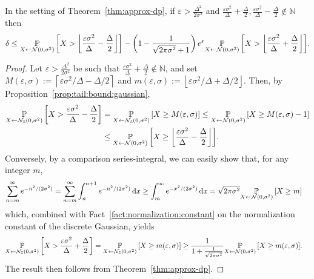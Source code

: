 \documentclass{jpc}
\newcommand{\dgausss}[2]{{\discN\left(#1,#2\right)}}
\newcommand{\dgauss}[1]{\dgausss{0}{#1}}
\newcommand{\pr}[2]{{\ifx&#1& \mathbb{P} \else
\underset{#1}{\mathbb{P}} \fi \left[#2\right]}}
\newcommand{\eqdef}{:=}
\newcommand{\eps}{\varepsilon}
\newcommand{\dx}[1][x]{\mathrm{d}#1}
\begin{document}
\begin{lem}
In the setting of Theorem~\ref{thm:approx-dp}, if $\eps > \frac{\Delta^2}{2\sigma^2}$ and $\frac{\eps\sigma^2}{\Delta}+\frac{\Delta}{2},\frac{\eps\sigma^2}{\Delta}-\frac{\Delta}{2}\notin \mathbb{N}$ then
\begin{equation}
\delta \le \pr{X \gets \mathcal{N}(0,\sigma^2)}{ X > \left\lfloor \frac{\eps\sigma^2}{\Delta}-\frac{\Delta}{2} \right\rfloor }-\left(1-\frac{1}{\sqrt{2\pi\sigma^2}+1}\right)e^\eps\pr{X \gets \mathcal{N}(0,\sigma^2)}{X > \left\lfloor \frac{\eps\sigma^2}{\Delta}+\frac{\Delta}{2} \right\rfloor }.
\end{equation}
\end{lem}
\begin{proof}
Let $\eps > \frac{\Delta^2}{2\sigma^2}$ be such that $\frac{\eps\sigma^2}{\Delta}+\frac{\Delta}{2}\notin \mathbb{N}$, and set $M(\eps,\sigma) \eqdef \left\lceil {\eps\sigma^2}/{\Delta}-{\Delta}/{2} \right\rceil$ and $m(\eps,\sigma) \eqdef \left\lfloor {\eps\sigma^2}/{\Delta}+{\Delta}/{2} \right\rfloor$. Then, by Proposition~\ref{prop:tail:bound:gaussian},
\begin{align*}
    \pr{X \gets \dgauss{\sigma^2}}{ X > \frac{\eps\sigma^2}{\Delta}-\frac{\Delta}{2} }
    &= \pr{X \gets \dgauss{\sigma^2}}{ X \geq M(\eps,\sigma) }
    \leq \pr{X \gets \mathcal{N}(0,\sigma^2)}{ X \geq M(\eps,\sigma)-1 } \\
    &\leq \pr{X \gets \mathcal{N}(0,\sigma^2)}{ X \geq \left\lfloor \frac{\eps\sigma^2}{\Delta}-\frac{\Delta}{2} \right\rfloor }.
\end{align*}
Conversely, by a comparison series-integral, we can easily show that, for any integer $m$,
\begin{align*}
\sum_{n=m}^\infty e^{-n^2/(2\sigma^2)}
&= \sum_{n=m}^\infty \int_{n}^{n+1} e^{-n^2/(2\sigma^2)}\,\dx
\geq \int_{m}^\infty e^{-x^2/(2\sigma^2)}\,\dx
= \sqrt{2\pi\sigma^2}\pr{X \gets \mathcal{N}(0,\sigma^2)}{ X \geq m }
\end{align*}
which, combined with Fact~\ref{fact:normalization:constant} on the normalization constant of the discrete Gaussian, yields
\begin{align*}
    \pr{X \gets \dgauss{\sigma^2}}{ X > \frac{\eps\sigma^2}{\Delta}+\frac{\Delta}{2} }
    &= \pr{X \gets \dgauss{\sigma^2}}{ X \geq m(\eps,\sigma) }
    \geq \frac{1}{1+\frac{1}{\sqrt{2\pi\sigma^2}}}\pr{X \gets \mathcal{N}(0,\sigma^2)}{ X \geq m(\eps,\sigma) }.
\end{align*}
The result then follows from Theorem~\ref{thm:approx-dp}.
\end{proof}
\end{document}

